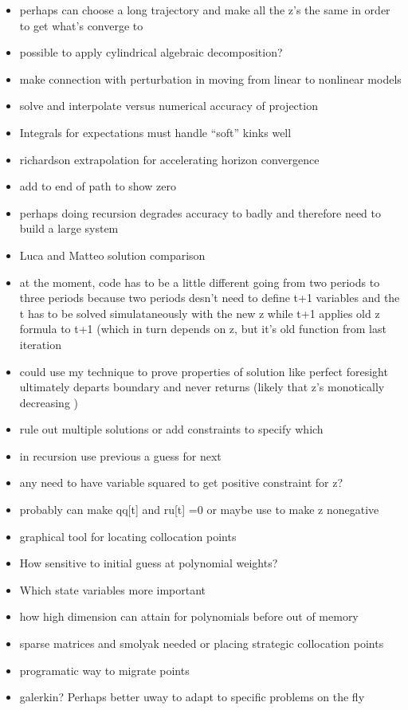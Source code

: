 \documentclass[12pt]{article}
\begin{document}
\begin{itemize}
\item perhaps can choose a long trajectory and make all the z's the same in order to get what's converge to
\item possible to apply cylindrical algebraic decomposition?
\item make connection with perturbation in moving from linear to nonlinear models
\item solve and interpolate versus numerical accuracy of projection
\item Integrals for expectations must handle ``soft'' kinks well
\item richardson extrapolation for accelerating horizon convergence
\item add to end of path to show zero
\item perhaps doing recursion degrades accuracy to badly and therefore need to build a large system
\item Luca and Matteo solution comparison
\item at the moment, code has to be a little different going from two periods to three periods because two periods desn't need to define  t+1 variables and the t has to be solved simulataneously with the new z while t+1 applies old z formula to t+1 (which in turn depends on z, but it's old function from last iteration
\item could use my technique to prove properties of solution like perfect foresight ultimately departs boundary and never returns  (likely that z's monotically decreasing )
\item rule out multiple solutions or add constraints to specify which
\item in recursion use previous a guess for next
\item any need to have variable squared to get positive constraint for z?
\item probably can make qq[t] and ru[t] =0 or maybe use to make z nonegative
\item graphical tool for locating collocation points
\item How sensitive to initial guess at polynomial weights?
\item Which state variables more important
\item how high dimension can attain for polynomials before out of memory
\item sparse matrices and smolyak needed or placing strategic collocation points
\item programatic way to migrate points
\item galerkin?  Perhaps better uway to adapt to specific problems on the fly

\end{itemize}
\end{document}
